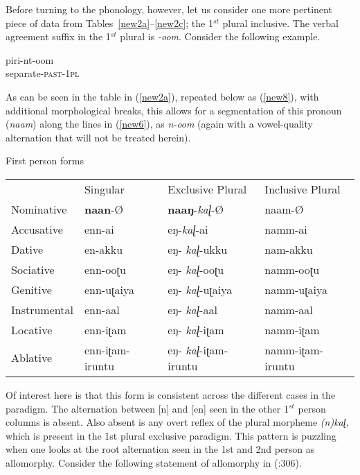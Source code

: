 \documentclass[output=paper,colorlinks,citecolor=brown,
]{langscibook}
\begin{document}
Before turning to the phonology, however, let us consider one more pertinent piece of data from Tables~\ref{new2a}--\ref{new2c}; the 1$^{st}$ plural inclusive. The verbal agreement suffix in the 1$^{st}$ plural is \textit{-oom}. Consider the following example.

\begin{exe}
\ex \label{new7}
\gll piri-nt-oom \\
separate-\textsc{past-1pl}   \\
\end{exe}

As can be seen in the table in (\ref{new2a}), repeated below as (\ref{new8}), with additional morphological breaks, this allows for a segmentation of this pronoun (\textit{naam}) along the lines in (\ref{new6}), as \textit{n-oom} (again with a vowel-quality alternation that will not be treated herein).

\begin{exe} 
\ex \label{new8} First person forms
\\
\begin{tabular}{llll}
             & Singular        & Exclusive Plural      & Inclusive Plural \\
Nominative   & \textbf{naan}-Ø          & \textbf{naaŋ}-\textit{kaɭ}-Ø            & naam-Ø           \\
Accusative   & enn-ai          & eŋ-\textit{kaɭ}-ai             & namm-ai          \\
Dative       & en-akku         & eŋ-   \textit{kaɭ}-ukku        & nam-akku         \\
Sociative    & enn-ooʈu        & eŋ-   \textit{kaɭ}-ooʈu        & namm-ooʈu        \\
Genitive     & enn-uʈaiya      & eŋ-   \textit{kaɭ}-uʈaiya      & namm-uʈaiya      \\
Instrumental & enn-aal         & eŋ-   \textit{kaɭ}-aal         & namm-aal         \\
Locative     & enn-iʈam        & eŋ-   \textit{kaɭ}-iʈam        & namm-iʈam        \\
Ablative     & enn-iʈam-iruntu & eŋ-   \textit{kaɭ}-iʈam-iruntu & namm-iʈam-iruntu
\end{tabular}
\end{exe}

Of interest here is that this form is consistent across the different cases in the paradigm. The alternation between [n] and [en] seen in the other 1$^{st}$ person columns is absent. Also absent is any overt reflex of the plural morpheme \textit{(n)kaɭ}, which is present in the 1st plural exclusive paradigm. This pattern is puzzling when one looks at the root alternation seen in the 1st and 2nd person as allomorphy. Consider the following statement of allomorphy in \citeauthor{moskal2016towards} (\citeyear{moskal2016towards}:306).
\end{document}
